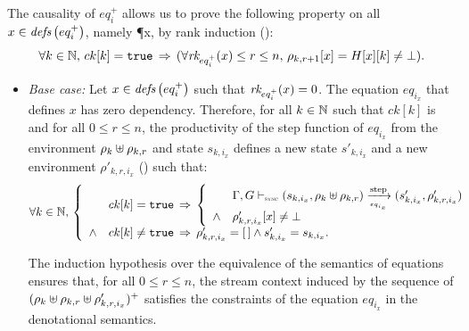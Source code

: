 \begin{skippableproof}
    The causality of $eq_i^+$ allows us to prove the following property on all
    $x \in {\ensuremath{\textit{defs}\left(eq_i^+\right)}}$, namely \P{x}, by rank induction
    ():
    \begin{equation*}
        \forall k \in \mathbb{N}, \, ck[k] = \mathtt{{true}} \, \Rightarrow \,
        (\forall {\ensuremath{\textit{rk}_{eq_i^+}(x)}} \le r \le n, \, \rho_{k,r+1}[x] = H[x][k] \neq \bot).
    \end{equation*}
    \begin{itemize}
        \item \textit{Base case:} Let $x \in {\ensuremath{\textit{defs}\left(eq_i^+\right)}}$ such that ${\textit{rk}_{eq_i^+}(x)} = 0$.
              The equation $eq_{i_x}$ that defines $x$ has zero dependency.
              Therefore, for all $k \in \mathbb{N}$ such that $ck[k]$ is \true and for all
              $0 \le r \le n$, the productivity of the step function of $eq_{i_x}$ from the
              environment $\rho_k \uplus \rho_{k,r}$ and state $s_{k,i_x}$ defines a new state
              $s'_{k,i_x}$ and a new environment $\rho'_{k,r,i_x}$ () such that:
              \begin{equation*}
                  \forall k \in \N, \,
                  \left\{
                  \begin{array}{ll}
                             & ck[k] = \true \, \Rightarrow \,
                      \left\{
                      \begin{array}{ll}
                                 & \eqOpsem{\rho_k \ctxconcat \rho_{k,r}}{s_{k,i_x}}{eq_{i_x}}{s'_{k,i_x}}{\rho'_{k,r,i_x}} \\
                          \wedge & \rho'_{k,r,i_x}[x] \neq \bot                                                             \\
                      \end{array}
                      \right.                                                                                                \\
                      \wedge & ck[k] \neq \true \, \Rightarrow \, \rho'_{k,r,i_x} = \emptyrho \wedge s'_{k,i_x} = s_{k,i_x}. \\
                  \end{array}
                  \right.
              \end{equation*}

              The induction hypothesis over the equivalence of the semantics of equations ensures
              that, for all $0 \le r \le n$, the stream context induced by the sequence of $(\rho_k
                  \uplus \rho_{k,r} \uplus \rho'_{k,r,i_x})^+$ satisfies the constraints of the
              equation $eq_{i_x}$ in the denotational semantics.


\end{itemize}
\end{skippableproof}

